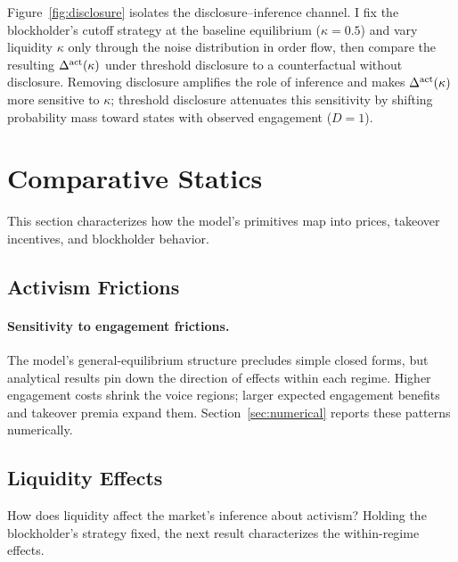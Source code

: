 Figure~\ref{fig:disclosure} isolates the disclosure--inference channel. I fix the blockholder's cutoff strategy at the baseline equilibrium ($\kappa=0.5$) and vary liquidity $\kappa$ only through the noise distribution in order flow, then compare the resulting $\Delta^{\textup{act}}(\kappa)$ under threshold disclosure to a counterfactual without disclosure. Removing disclosure amplifies the role of inference and makes $\Delta^{\textup{act}}(\kappa)$ more sensitive to $\kappa$; threshold disclosure attenuates this sensitivity by shifting probability mass toward states with observed engagement ($D=1$).

\section{Comparative Statics}
\label{sec:comp-statics}

This section characterizes how the model's primitives map into prices, takeover incentives, and blockholder behavior.

\subsection{Activism Frictions}

\paragraph{Sensitivity to engagement frictions.}
The model's general-equilibrium structure precludes simple closed forms, but analytical results pin down the direction of effects within each regime. Higher engagement costs shrink the voice regions; larger expected engagement benefits and takeover premia expand them. Section~\ref{sec:numerical} reports these patterns numerically.

\subsection{Liquidity Effects}

How does liquidity affect the market's inference about activism? Holding the blockholder's strategy fixed, the next result characterizes the within-regime effects.

